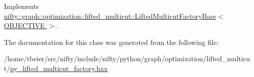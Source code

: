 Implements \hyperlink{classnifty_1_1graph_1_1optimization_1_1lifted__multicut_1_1LiftedMulticutFactoryBase_a96b3ee71a961471371c92be56d25de16}{nifty\+::graph\+::optimization\+::lifted\+\_\+multicut\+::\+Lifted\+Multicut\+Factory\+Base$<$ O\+B\+J\+E\+C\+T\+I\+V\+E $>$}.



The documentation for this class was generated from the following file\+:\begin{DoxyCompactItemize}
\item 
/home/tbeier/src/nifty/include/nifty/python/graph/optimization/lifted\+\_\+multicut/\hyperlink{py__lifted__multicut__factory_8hxx}{py\+\_\+lifted\+\_\+multicut\+\_\+factory.\+hxx}\end{DoxyCompactItemize}
